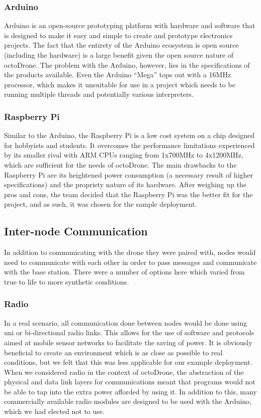\subsubsection{Arduino}
Arduino is an open-source prototyping platform with hardware and software that is designed to make it easy and simple to create and prototype electronics projects\cite{arduinoguide}. The fact that the entirety of the Arduino ecosystem is open source (including the hardware) is a large benefit given the open source nature of octoDrone. The problem with the Arduino, however, lies in the specifications of the products available. Even the Arduino ``Mega'' tops out with a 16MHz processor, which makes it unsuitable for use in a project which needs to be running multiple threads and potentially various interpreters.

\subsubsection{Raspberry Pi}
Similar to the Arduino, the Raspberry Pi is a low cost system on a chip designed for hobbyists and students. It overcomes the performance limitations experienced by its smaller rival with ARM CPUs ranging from 1x700MHz to 4x1200MHz\cite{rpiguide}, which are sufficient for the needs of octoDrone. The main drawbacks to the Raspberry Pi are its heightened power consumption (a necessary result of higher specifications) and the propriety nature of its hardware. After weighing up the pros and cons, the team decided that the Raspberry Pi was the better fit for the project, and as such, it was chosen for the sample deployment.

\subsection{Inter-node Communication}
In addition to communicating with the drone they were paired with, nodes would need to communicate with each other in order to pass messages and communicate with the base station. There were a number of options here which varied from true to life to more synthetic conditions.

\subsubsection{Radio}
In a real scenario, all communication done between nodes would be done using uni or bi-directional radio links. This allows for the use of software and protocols aimed at mobile sensor networks to facilitate the saving of power. It is obviously beneficial to create an environment which is as close as possible to real conditions, but we felt that this was less applicable for our example deployment. When we considered radio in the context of octoDrone, the abstraction of the physical and data link layers for communications meant that programs would not be able to tap into the extra power afforded by using it. In addition to this, many commercially available radio modules are designed to be used with the Arduino, which we had elected not to use.

